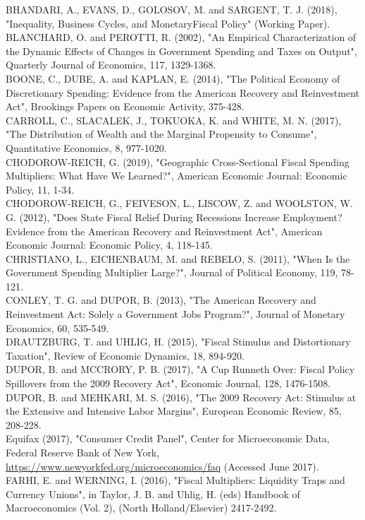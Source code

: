 \documentclass[10pt]{article}
\begin{document}
BHANDARI, A., EVANS, D., GOLOSOV, M. and SARGENT, T. J. (2018), "Inequality, Business Cycles, and MonetaryFiscal Policy" (Working Paper).\\
BLANCHARD, O. and PEROTTI, R. (2002), "An Empirical Characterization of the Dynamic Effects of Changes in Government Spending and Taxes on Output", Quarterly Journal of Economics, 117, 1329-1368.\\
BOONE, C., DUBE, A. and KAPLAN, E. (2014), "The Political Economy of Discretionary Spending: Evidence from the American Recovery and Reinvestment Act", Brookings Papers on Economic Activity, 375-428.\\
CARROLL, C., SLACALEK, J., TOKUOKA, K. and WHITE, M. N. (2017), "The Distribution of Wealth and the Marginal Propensity to Consume", Quantitative Economics, 8, 977-1020.\\
CHODOROW-REICH, G. (2019), "Geographic Cross-Sectional Fiscal Spending Multipliers: What Have We Learned?", American Economic Journal: Economic Policy, 11, 1-34.\\
CHODOROW-REICH, G., FEIVESON, L., LISCOW, Z. and WOOLSTON, W. G. (2012), "Does State Fiscal Relief During Recessions Increase Employment? Evidence from the American Recovery and Reinvestment Act", American Economic Journal: Economic Policy, 4, 118-145.\\
CHRISTIANO, L., EICHENBAUM, M. and REBELO, S. (2011), "When Is the Government Spending Multiplier Large?", Journal of Political Economy, 119, 78-121.\\
CONLEY, T. G. and DUPOR, B. (2013), "The American Recovery and Reinvestment Act: Solely a Government Jobs Program?", Journal of Monetary Economics, 60, 535-549.\\
DRAUTZBURG, T. and UHLIG, H. (2015), "Fiscal Stimulus and Distortionary Taxation", Review of Economic Dynamics, 18, 894-920.\\
DUPOR, B. and MCCRORY, P. B. (2017), "A Cup Runneth Over: Fiscal Policy Spillovers from the 2009 Recovery Act", Economic Journal, 128, 1476-1508.\\
DUPOR, B. and MEHKARI, M. S. (2016), "The 2009 Recovery Act: Stimulus at the Extensive and Intensive Labor Margins", European Economic Review, 85, 208-228.\\
Equifax (2017), "Consumer Credit Panel", Center for Microeconomic Data, Federal Reserve Bank of New York, \href{https://www.newyorkfed.org/microeconomics/faq}{https://www.newyorkfed.org/microeconomics/faq} (Accessed June 2017).\\
FARHI, E. and WERNING, I. (2016), "Fiscal Multipliers: Liquidity Traps and Currency Unions", in Taylor, J. B. and Uhlig, H. (eds) Handbook of Macroeconomics (Vol. 2), (North Holland/Elsevier) 2417-2492.\\
\end{document}
